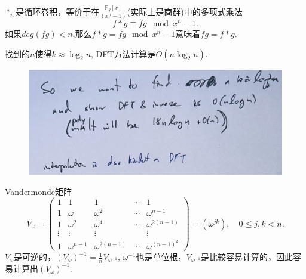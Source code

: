 \documentclass[10pt]{ctexart}
\begin{document}
$*_n$是循环卷积，等价于在$\frac{\mathbb{F}_q[x]}{(x^n-1)}$(实际上是商群)中的多项式乘法
$$
f * g \equiv fg \mod x^n - 1.
$$
如果$deg(fg)<n$,那么$f * g = fg \mod x^n - 1$意味着$fg = f * g$.

找到的$n$使得$k \approx \log_2 n$, DFT方法计算是$O(n \log_2n)$.
\begin{figure}[H]
    \centering
    \includegraphics[width=1\textwidth]{./img/DFT.png} 
\end{figure}
Vandermonde矩阵
\begin{displaymath}
    V_{\omega} =      \left(
    \begin{matrix}
        1 & 1 & 1 & \cdots & 1 \\
        1 & \omega & \omega^2 & \cdots & \omega^{n-1} \\
        1 & \omega^2 & \omega^4 & \cdots & \omega^{2(n-1)} \\
        \vdots & \vdots & \vdots &  & \vdots \\
        1 & \omega^{n-1} & \omega^{2(n-1)} & \cdots & \omega^{(n-1)^2} 
    \end{matrix}
\right)
    = \left(\omega^{jk}\right), \quad 0 \le j,k <n.
\end{displaymath}
$V_{\omega}$是可逆的，$(V_{\omega})^{-1} = \frac{1}{n}V_{\omega^{-1}}$, $\omega^{-1}$也是单位根，$V_{\omega^{-1}}$是比较容易计算的，因此容易计算出$(V_{\omega})^{-1}$.
\end{document}

